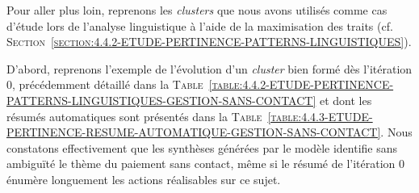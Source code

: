 			Pour aller plus loin, reprenons les \textit{clusters} que nous avons utilisés comme cas d'étude lors de l'analyse linguistique à l'aide de la maximisation des traits (cf. \textsc{Section~\ref{section:4.4.2-ETUDE-PERTINENCE-PATTERNS-LINGUISTIQUES}}).
			
			D'abord, reprenons l'exemple de l'évolution d'un \textit{cluster} bien formé dès l'itération $0$, précédemment détaillé dans la \textsc{Table~\ref{table:4.4.2-ETUDE-PERTINENCE-PATTERNS-LINGUISTIQUES-GESTION-SANS-CONTACT}} et dont les résumés automatiques sont présentés dans la \textsc{Table~\ref{table:4.4.3-ETUDE-PERTINENCE-RESUME-AUTOMATIQUE-GESTION-SANS-CONTACT}}.
			Nous constatons effectivement que les synthèses générées par le modèle identifie sans ambiguïté le thème du paiement sans contact, même si le résumé de l'itération $0$ énumère longuement les actions réalisables sur ce sujet.
